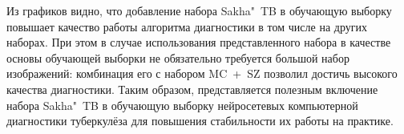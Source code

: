 



Из графиков видно, что добавление набора Sakha"~TB в обучающую выборку повышает качество работы алгоритма диагностики в том числе на других наборах. При этом в случае использования представленного набора в качестве основы обучающей выборки не обязательно требуется большой набор изображений: комбинация его с набором MC~+~SZ позволил достичь высокого качества диагностики. Таким образом, представляется полезным включение набора Sakha"~TB в обучающую выборку нейросетевых  компьютерной диагностики туберкулёза для повышения стабильности их работы на практике.

\clearpage